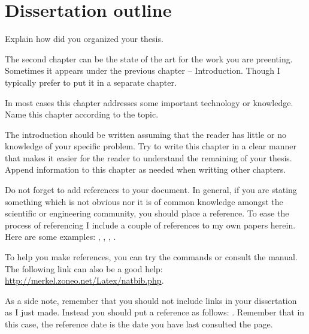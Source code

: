 \documentclass[defaultstyle,10pt,master,Helvetica]{thesis}
\begin{document}
\section{Dissertation outline}

Explain how did you organized your thesis.

%
% 
% 
% 

\cleardoublepage

The second chapter can be the state of the art for the work you are preenting. Sometimes it appears under the previous chapter -- Introduction. Though I typically prefer to put it in a separate chapter.

In most cases this chapter addresses some important technology or knowledge. Name this chapter according to the topic.

The introduction should be written assuming that the reader has little or no knowledge of your specific problem. Try to write this chapter in a clear manner that makes it easier for the reader to understand the remaining of your thesis. Append information to this chapter as needed when writting other chapters.

Do not forget to add references to your document. In general, if you are stating something which is not obvious nor it is of common knowledge amongst the scientific or engineering community, you should place a reference. To ease the process of referencing I include a couple of references to my own papers herein. Here are some examples: \cite{tomas2010bda}, \citep{tomas2010aqa}, \citet{ramalho2010eic}, \mbox{\cite[(2.2)]{tomas2009nct}}.

To help you make references, you can try the commands or consult the manual. The following link can also be a good help:
\mbox{\underline{http://merkel.zoneo.net/Latex/natbib.php}}.

As a side note, remember that you should not include links in your dissertation as I just made. Instead you should put a reference as follows: \cite{mylink}. Remember that in this case, the reference date is the date you have last consulted the page.
\end{document}
